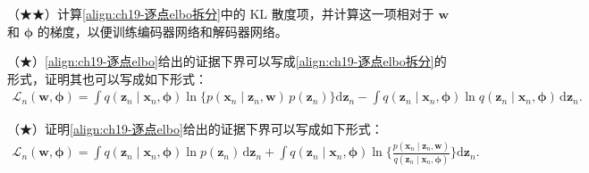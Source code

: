 \documentclass[../../main.tex]{subfiles}
\begin{document}
\begin{exercise}\label{exercise:ch19-04}
（★★）计算\eqref{align:ch19-逐点elbo拆分}中的 KL 散度项，并计算这一项相对于 $\bm{w}$ 和 $\bm{\phi}$ 的梯度，以便训练编码器网络和解码器网络。
\end{exercise}

\begin{exercise}\label{exercise:ch19-05}
（★）\eqref{align:ch19-逐点elbo}给出的证据下界可以写成\eqref{align:ch19-逐点elbo拆分}的形式，证明其也可以写成如下形式：
\begin{align}
\mathcal{L}_n(\bm{w},\bm{\phi})=\int q(\bm{z}_n\mid\bm{x}_n,\bm{\phi})\ln\big\{p(\bm{x}_n\mid\bm{z}_n,\bm{w})\,p(\bm{z}_n)\big\}\mathrm{d}\bm{z}_n-\int q(\bm{z}_n\mid\bm{x}_n,\bm{\phi})\ln q(\bm{z}_n\mid\bm{x}_n,\bm{\phi})\,\mathrm{d}\bm{z}_n.
\label{align:ch19-elbo形式一}
\end{align}
\end{exercise}

\begin{exercise}\label{exercise:ch19-06}
（★）证明\eqref{align:ch19-逐点elbo}给出的证据下界可以写成如下形式：
\begin{align}
\mathcal{L}_n(\bm{w},\bm{\phi})=\int q(\bm{z}_n\mid\bm{x}_n,\bm{\phi})\ln p(\bm{z}_n)\,\mathrm{d}\bm{z}_n+\int q(\bm{z}_n\mid\bm{x}_n,\bm{\phi})\ln\Big\{\frac{p(\bm{x}_n\mid\bm{z}_n,\bm{w})}{q(\bm{z}_n\mid\bm{x}_n,\bm{\phi})}\Big\}\mathrm{d}\bm{z}_n.
\label{align:ch19-elbo形式二}
\end{align}
\end{exercise}
\end{document}
